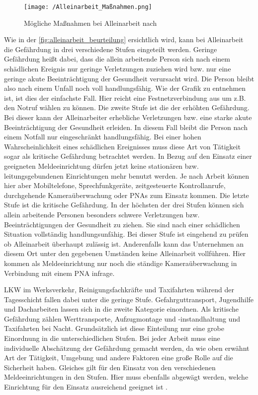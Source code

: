 \documentclass[thesis.tex]{subfiles}
\begin{document}
\begin{figure}[h]
    \centering
    \texttt{[image: /Alleinarbeit\_Maßnahmen.png]}
    \caption{Mögliche Maßnahmen bei Alleinarbeit nach \cite[]{Information_212-139}}
    \label{fig:alleinarbeit_beurteilung}
\end{figure}

Wie in der \autoref{fig:alleinarbeit_beurteilung} ersichtlich wird, kann bei Alleinarbeit die Gefährdung in drei verschiedene Stufen eingeteilt werden.
Geringe Gefährdung heißt dabei, dass die allein arbeitende Person sich nach einem schädlichen Ereignis nur geringe Verletzungen zuziehen wird bzw. nur eine geringe akute Beeinträchtigung der Gesundheit verursacht wird.
Die Person bleibt also nach einem Unfall noch voll handlungsfähig.
Wie der Grafik zu entnehmen ist, ist dies der einfachste Fall.
Hier reicht eine Festnetzverbindung aus um z.B. den Notruf wählen zu können.
Die zweite Stufe ist die der erhöhten Gefährdung.
Bei dieser kann der Alleinarbeiter erhebliche Verletzungen bzw. eine starke akute Beeinträchtigung der Gesundheit erleiden.
In diesem Fall bleibt die Person nach einem Notfall nur eingeschränkt handlungsfähig.
Bei einer hohen Wahrscheinlichkeit eines schädlichen Ereignisses muss diese Art von Tätigkeit sogar als kritische Gefährdung betrachtet werden.
In Bezug auf den Einsatz einer geeigneten Meldeeinrichtung dürfen jetzt keine stationären bzw. leitungsgebundenen Einrichtungen mehr benutzt werden.
Je nach Arbeit können hier aber Mobiltelefone, Sprechfunkgeräte, zeitgesteuerte Kontrollanrufe, durchgehende Kameraüberwachung oder PNAs zum Einsatz kommen.
Die letzte Stufe ist die kritische Gefährdung.
In der höchsten der drei Stufen können sich allein arbeitende Personen besonders schwere Verletzungen bzw. Beeinträchtigungen der Gesundheit zu ziehen.
Sie sind nach einer schädlichen Situation vollständig handlungsunfähig.
Bei dieser Stufe ist eingehend zu prüfen ob Alleinarbeit überhaupt zulässig ist.
Anderenfalls kann das Unternehmen an diesem Ort unter den gegebenen Umständen keine Alleinarbeit vollführen.
Hier kommen als Meldeeinrichtung nur noch die ständige Kameraüberwachung in Verbindung mit einem PNA infrage.

LKW im Werksverkehr, Reinigungsfachkräfte und Taxifahrten während der Tagesschicht fallen dabei unter die geringe Stufe.
Gefahrguttransport, Jugendhilfe und Dacharbeiten lassen sich in die zweite Kategorie einordnen.
Als kritische Gefährdung zählen Werttransporte, Aufzugmontage und -instandhaltung und Taxifahrten bei Nacht.
Grundsätzlich ist diese Einteilung nur eine grobe Einordnung in die unterschiedlichen Stufen.
Bei jeder Arbeit muss eine individuelle Abschätzung der Gefährdung gemacht werden, da wie oben erwähnt Art der Tätigkeit, Umgebung und andere Faktoren eine große Rolle auf die Sicherheit haben.
Gleiches gilt für den Einsatz von den verschiedenen Meldeeinrichtungen in den Stufen.
Hier muss ebenfalls abgewägt werden, welche Einrichtung für den Einsatz ausreichend geeignet ist \cite[vgl. S.7-9]{Information_212-139}.
\end{document}
